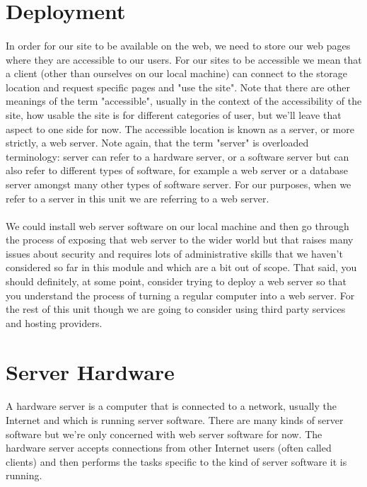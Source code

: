 \section{Deployment}
\paragraph{} In order for our site to be available on the web, we need to store our web pages where they are accessible to our users. For our sites to be accessible we mean that a client (other than ourselves on our local machine) can connect to the storage location and request specific pages and "use the site". Note that there are other meanings of the term "accessible", usually in the context of the accessibility of the site, how usable the site is for different categories of user, but we'll leave that aspect to one side for now. The accessible location is known as a server, or more strictly, a web server. Note again, that the term "server" is overloaded terminology: server can refer to a hardware server, or a software server but can also refer to different types of software, for example a web server or a database server amongst many other types of software server. For our purposes, when we refer to a server in this unit we are referring to a web server.
\paragraph{} We could install web server software on our local machine and then go through the process of exposing that web server to the wider world but that raises many issues about security and requires lots of administrative skills that we haven't considered so far in this module and which are a bit out of scope. That said, you should definitely, at some point, consider trying to deploy a web server so that you understand the process of turning a regular computer into a web server. For the rest of this unit though we are going to consider using third party services and hosting providers.

\section{Server Hardware}
\paragraph{} A hardware server is a computer that is connected to a network, usually the Internet and which is running server software. There are many kinds of server software but we're only concerned with web server software for now. The hardware server accepts connections from other Internet users (often called clients) and then performs the tasks specific to the kind of server software it is running.
